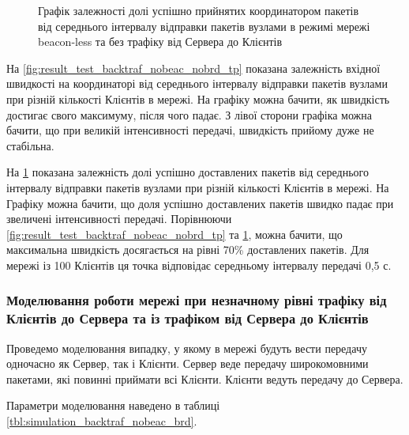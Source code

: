 \documentclass[a4paper,ukrainian,utf8,nocolumnsxix,nocolumnxxxii,nocolumnxxxi,floatsection,equationsection]{eskdtext}
\newcommand{\longcaption}[1]{\captionsetup{style=figureLongCaption}\caption{#1}}
\renewcommand\paragraph{\subsubsection}
\newcommand{\blm}[0]{beacon-less\xspace}
\begin{document}
\begin{figure}[htbp]
	\centering
	\longcaption{\label{fig:result_test_backtraf_nobeac_nobrd_succ_rate}Графік залежності долі успішно прийнятих координатором пакетів від середнього інтервалу відправки пакетів вузлами в режимі мережі \blm та без трафіку від Сервера до Клієнтів}
\end{figure}

На \cref{fig:result_test_backtraf_nobeac_nobrd_tp} показана залежність вхідної швидкості на координаторі від середнього інтервалу відправки пакетів вузлами при різній кількості Клієнтів в мережі. На графіку можна бачити, як швидкість достигає свого максимуму, після чого падає. З лівої сторони графіка можна бачити, що при великій інтенсивності передачі, швидкість прийому дуже не стабільна.

На \cref{fig:result_test_backtraf_nobeac_nobrd_succ_rate} показана залежність долі успішно доставлених пакетів від середнього інтервалу відправки пакетів вузлами при різній кількості Клієнтів в мережі. На Графіку можна бачити, що доля успішно доставлених пакетів швидко падає при звеличені інтенсивності передачі. Порівнюючи \cref{fig:result_test_backtraf_nobeac_nobrd_tp} та \cref{fig:result_test_backtraf_nobeac_nobrd_succ_rate}, можна бачити, що максимальна швидкість досягається на рівні 70\% доставлених пакетів. Для мережі із 100 Клієнтів ця точка відповідає середньому інтервалу передачі 0,5 с.

\paragraph{Моделювання роботи мережі при незначному рівні трафіку від Клієнтів до Сервера та із трафіком від Сервера до Клієнтів}

Проведемо моделювання випадку, у якому в мережі будуть вести передачу одночасно як Сервер, так і Клієнти. Сервер веде передачу широкомовними пакетами, які повинні приймати всі Клієнти. Клієнти ведуть передачу до Сервера.

Параметри моделювання наведено в таблиці \ref{tbl:simulation_backtraf_nobeac_brd}.
\end{document}
